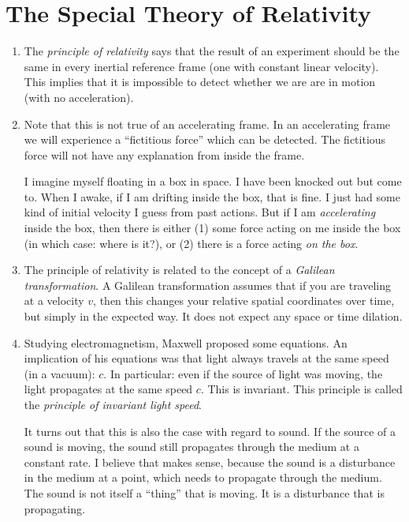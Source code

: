 \section{The Special Theory of Relativity}

\begin{enumerate}

  \item The \emph{principle of relativity} says that the result of an
  experiment should be the same in every inertial reference frame (one
  with constant linear velocity). This implies that it is impossible to
  detect whether we are are in motion (with no acceleration).

  \item Note that this is not true of an accelerating frame. In an
  accelerating frame we will experience a ``fictitious force'' which can
  be detected. The fictitious force will not have any explanation from
  inside the frame.

  I imagine myself floating in a box in space. I have been knocked out
  but come to. When I awake, if I am drifting inside the box, that is
  fine. I just had some kind of initial velocity I guess from past
  actions. But if I am \emph{accelerating} inside the box, then there
  is either (1) some force acting on me inside the box (in which case:
  where is it?), or (2) there is a force acting \emph{on the box}.

  \item The principle of relativity is related to the concept of a
  \emph{Galilean transformation}. A Galilean transformation assumes that
  if you are traveling at a velocity $v$, then this changes your
  relative spatial coordinates over time, but simply in the expected
  way. It does not expect any space or time dilation.

  \item Studying electromagnetism, Maxwell proposed some equations. An
  implication of his equations was that light always travels at the same
  speed (in a vacuum): $c$. In particular: even if the source of light
  was moving, the light propagates at the same speed $c$. This is
  invariant. This principle is called the \emph{principle of invariant
  light speed}.

  It turns out that this is also the case with regard to sound. If the
  source of a sound is moving, the sound still propagates through the
  medium at a constant rate. I believe that makes sense, because the
  sound is a disturbance in the medium at a point, which needs to
  propagate through the medium. The sound is not itself a ``thing'' that
  is moving. It is a disturbance that is propagating.


\end{enumerate}
